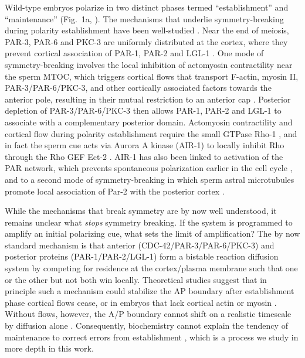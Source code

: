 \documentclass[11pt]{article}
\newcommand{\6}[1]{#1_{\text{6}}}
\newcommand{\3}[1]{#1_{\text{3}}}
\begin{document}
Wild-type embryos polarize in two distinct phases termed ``establishment'' and ``maintenance'' (Fig.\ 1a, \cite{cuenca2003polarization}). The mechanisms that underlie symmetry-breaking during polarity establishment have been well-studied \citep{cowan2007acto, munro2009cellular,gross2019guiding, reich2019regulated}.  Near the end of meiosis, PAR-3, PAR-6 and PKC-3 are uniformly distributed at the cortex, where they prevent cortical association of PAR-1, PAR-2 and LGL-1 \citep{schonegg2006cdc, others}.  One mode of symmetry-breaking involves the local inhibition of actomyosin contractility near the sperm MTOC, which triggers cortical flows that transport F-actin, myosin II, PAR-3/PAR-6/PKC-3, and other cortically associated factors towards the anterior pole, resulting in their mutual restriction to an anterior cap \citep{munro2004cortical, rodriguez2017apkc}. Posterior depletion of PAR-3/PAR-6/PKC-3 then allows PAR-1, PAR-2 and LGL-1 to associate with a complementary posterior domain.  Actomyosin contractility and cortical flow during polarity establishment require the small GTPase Rho-1 \citep{schonegg2006cdc, motegi2006sequential}, and in fact the sperm cue acts via Aurora A kinase (AIR-1) to locally inhibit Rho through the Rho GEF Ect-2 \citep{motegi2006sequential, tse2012rhoa, longhini2022aurora, kapoor2019centrosome}. AIR-1 has also been linked to activation of the PAR network, which prevents spontaneous polarization earlier in the cell cycle \citep{reich2019regulated}, and to a second mode of symmetry-breaking in which sperm astral microtubules promote local association of Par-2 with the posterior cortex \citep{motegi2011microtubules, klinkert2019aurora, manzi2024temporally}.

While the mechanisms that break symmetry are by now well understood, it remains unclear what \emph{stops} symmetry breaking. If the system is programmed to amplify an initial polarizing cue, what sets the limit of amplification? The by now standard mechanism is that anterior (CDC-42/PAR-3/PAR-6/PKC-3) and posterior proteins (PAR-1/PAR-2/LGL-1) form a bistable reaction diffusion system by competing for residence at the cortex/plasma membrane such that one or the other but not both win locally. Theoretical studies suggest that in principle such a mechanism could stabilize the AP boundary after establishment phase cortical flows cease, or in embryos that lack cortical actin or myosin \citep{mori2008wave, dawes20113, goehring2011polarization, lang2023oligomerization}. Without flows, however, the A/P boundary cannot shift on a realistic timescale by diffusion alone  \citep{lang2023oligomerization}. Consequently, biochemistry cannot explain the tendency of maintenance to correct errors from establishment \citep{zonies2010symmetry}, which is a process we study in more depth in this work.
\end{document}
